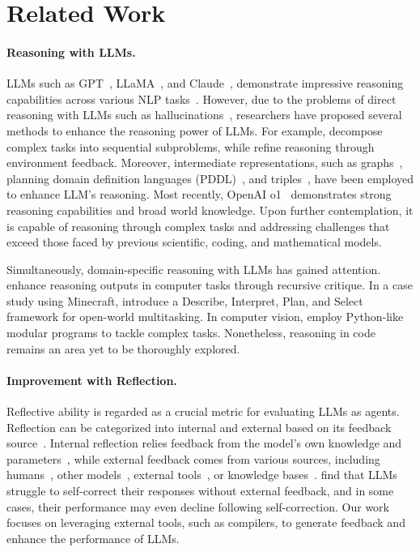 \section{Related Work}
\paragraph{Reasoning with LLMs.}
LLMs such as GPT~\citep{openai2023gpt4}, LLaMA~\citep{touvron2023llama}, and Claude~\citep{anthropic2024claude}, demonstrate impressive reasoning capabilities across various NLP tasks~\citep{zhang2024llm_reasong_survey}. However, due to the problems of direct reasoning with LLMs such as hallucinations~\citep{ji2023survey_hallucination}, researchers have proposed several methods to enhance the reasoning power of LLMs. For example, 
\citep{zhouleast2most, xue2025decompose} decompose complex tasks into sequential subproblems, while %
\citep{sun2024adaplanner_feedback} refine reasoning through environment feedback. Moreover, intermediate representations, such as graphs~\citep{jiang2024resprompt_graph}, planning domain definition languages (PDDL)~\citep{guan2023leveraging_PDDL}, and triples~\citep{wang2023boosting_CoK}, have been employed to enhance LLM's reasoning.
Most recently, OpenAI o1~\citep{openai2024o1} demonstrates strong reasoning capabilities and broad world knowledge. Upon further contemplation, it is capable of reasoning through complex tasks and addressing challenges that exceed those faced by previous scientific, coding, and mathematical models.

Simultaneously, domain-specific reasoning with LLMs has gained attention. \citep{kim2024language_reason_computer} enhance reasoning outputs in computer tasks through recursive critique. In a case study using Minecraft, \citep{wang2023describe_reason_mc} introduce a Describe, Interpret, Plan, and Select framework for open-world multitasking. In computer vision, \citep{gupta2023visual_reason_cv} employ Python-like modular programs to tackle complex tasks. Nonetheless, reasoning in code remains an area yet to be thoroughly explored.

\paragraph{Improvement with Reflection.} Reflective ability is regarded as a crucial metric for evaluating LLMs as agents. Reflection can be categorized into internal and external based on its feedback source~\citep{pan2024automatically}. Internal reflection relies feedback from the model's own knowledge and parameters~\citep{huang2022large}, while external feedback comes from various sources, including humans~\citep{wang2023shepherd}, other models~\citep{paul2024refiner}, external tools~\citep{gou2024critic, chen2024teaching}, or knowledge bases~\citep{yao2023react, asai2024selfrag}.
\citep{huang2024large} find that LLMs struggle to self-correct their responses without external feedback, and in some cases, their performance may even decline following self-correction. Our work focuses on leveraging external tools, such as compilers, to generate feedback and enhance the performance of LLMs.